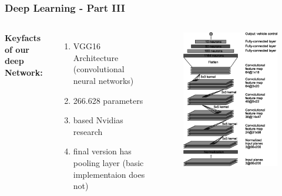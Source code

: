 \documentclass{beamer}
\begin{document}
%
%
\begin{frame}
\frametitle{Deep Learning - Part III}
\begin{columns}[c] %
\textbf{Keyfacts of our deep Network: }
\begin{enumerate}
\item VGG16 Architecture (convolutional neural networks)
\item 266.628 parameters
\item based Nvidias research 
\item final version has pooling layer (basic implementaion does not)
\end{enumerate}
\begin{figure}
\includegraphics[width=0.75\linewidth]{photo/CNNArchitecture.png}
\end{figure}
\end{columns}
\end{frame}
%
%
\end{document}
